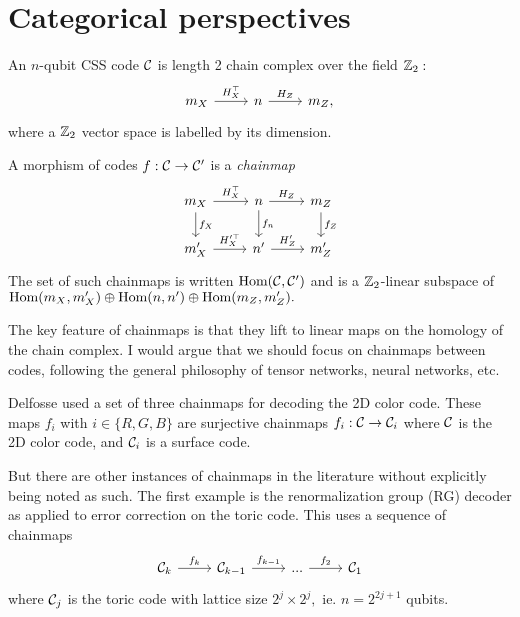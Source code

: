 \documentclass[12pt]{article}
\begin{document}



\section{Categorical perspectives}

An $n$-qubit CSS code $\mathcal{C}$ is length 2 chain complex over
the field $\mathbb{Z}_2:$
$$
\begin{tikzcd}
    m_X  \arrow{r}{H^\top_X} & n \arrow{r}{H_Z} & m_Z,
\end{tikzcd}
$$
where a $\mathbb{Z}_2$ vector space is labelled by its dimension.

A morphism of codes $f:\mathcal{C}\to\mathcal{C}'$
is a \emph{chainmap}
$$
\begin{tikzcd}
    m_X  \arrow{r}{H^\top_X} \arrow{d}{f_X}  & n \arrow{r}{H_Z} \arrow{d}{f_n} & m_Z \arrow{d}{f_Z} \\
    m'_X  \arrow{r}{H'^\top_X}  & n' \arrow{r}{H'_Z} & m'_Z 
\end{tikzcd}
$$
The set of such chainmaps is
written $\mbox{Hom}(\mathcal{C}, \mathcal{C}')$
and is a $\mathbb{Z}_2$-linear subspace of 
$\mbox{Hom}(m_X,m'_X)\oplus \mbox{Hom}(n,n')\oplus \mbox{Hom}(m_Z,m'_Z).$

The key feature of chainmaps is that
they lift to linear maps on the homology of
the chain complex.
I would argue that we should 
focus on  chainmaps between codes, following the
general philosophy of tensor networks,
neural networks, etc.

Delfosse \cite{delfosse2014} used a set of three chainmaps
for decoding the 2D color code.
These maps $f_i$ with $i\in\{R, G, B\}$ are surjective 
chainmaps $ f_i : \mathcal{C} \to \mathcal{C}_i $
where $\mathcal{C}$ is the 2D color code, and $\mathcal{C}_i$ is
a surface code.


But there are other instances of chainmaps
in the literature without explicitly being
noted as such.
The first example is the
renormalization group (RG) decoder 
\cite{duclos-cianci2010}
as applied to error correction on
the toric code.
This uses a sequence of chainmaps
$$
\begin{tikzcd}
    \Code_k  \arrow{r}{f_k} & \Code_{k-1} \arrow{r}{f_{k-1}} & ... 
    \arrow{r}{f_2} & \Code_1 
\end{tikzcd}
$$
where $\mathcal{C}_j$ is the toric code
with lattice size $2^j\times 2^j,$ ie. 
$n=2^{2j+1}$ qubits.
\end{document}
